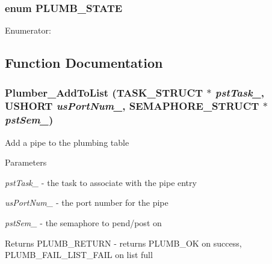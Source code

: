 \subsubsection[{PLUMB\_\-STATE}]{\setlength{\rightskip}{0pt plus 5cm}enum {\bf PLUMB\_\-STATE}}\label{plumber_8h_a55cf03a4dceea38620caef91996e8d61}
\begin{Desc}
\item[Enumerator: ]\par
\begin{description}
\item[{\em 
PLUMB\_\-UNINIT\label{plumber_8h_a55cf03a4dceea38620caef91996e8d61ae764d86aad94f6020fe3a4fb8132b7d2}
}]\item[{\em 
PLUMB\_\-CLOSED\label{plumber_8h_a55cf03a4dceea38620caef91996e8d61ac5ec1a1be838f0e6889b2669a5c3da6d}
}]\item[{\em 
PLUMB\_\-OPEN\label{plumber_8h_a55cf03a4dceea38620caef91996e8d61ac917bc1813c8fdaf5e462f97fe15c073}
}]\end{description}
\end{Desc}



\subsection{Function Documentation}
\subsubsection[{Plumber\_\-AddToList}]{ Plumber\_\-AddToList ({\bf TASK\_\-STRUCT} $\ast$ {\em pstTask\_\-}, \/  USHORT {\em usPortNum\_\-}, \/  {\bf SEMAPHORE\_\-STRUCT} $\ast$ {\em pstSem\_\-})}\label{plumber_8h_afb2faf088dab6991c0f27c296d92e05f}
Add a pipe to the plumbing table


\begin{DoxyParams}{Parameters}
\item[{\em pstTask\_\-}]-\/ the task to associate with the pipe entry \item[{\em usPortNum\_\-}]-\/ the port number for the pipe \item[{\em pstSem\_\-}]-\/ the semaphore to pend/post on \end{DoxyParams}
\begin{DoxyReturn}{Returns}
PLUMB\_\-RETURN -\/ returns PLUMB\_\-OK on success, PLUMB\_\-FAIL\_\-LIST\_\-FAIL on list full 
\end{DoxyReturn}
